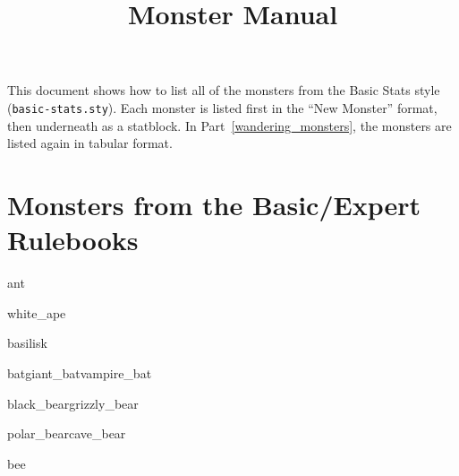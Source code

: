 \documentclass[a4paper,serif]{rpg-module}
\begin{document}
\raggedbottom

\title{Monster Manual}

\showtitle

This document shows how to list all of the monsters from the Basic Stats style (\verb|basic-stats.sty|).
Each monster is listed first in the ``New Monster'' format, then underneath as a statblock. In
Part~\ref{wandering_monsters}, the monsters are listed again in tabular format.

\part{Monsters from the Basic/Expert Rulebooks}

\begin{newmonster}{ant}
\lipsum[1]
\end{newmonster}

\begin{newmonster}{white_ape}\end{newmonster}

\begin{newmonster}{basilisk}\end{newmonster}



\begin{newmonster3}{bat}{giant_bat}{vampire_bat}
\lipsum[1]
\end{newmonster3}


\begin{newmonster2}{black_bear}{grizzly_bear}\end{newmonster2}
\begin{newmonster2*}{polar_bear}{cave_bear}{}{}\lipsum[2]\end{newmonster2*}

\begin{newmonster}{bee}\end{newmonster}
\end{document}
